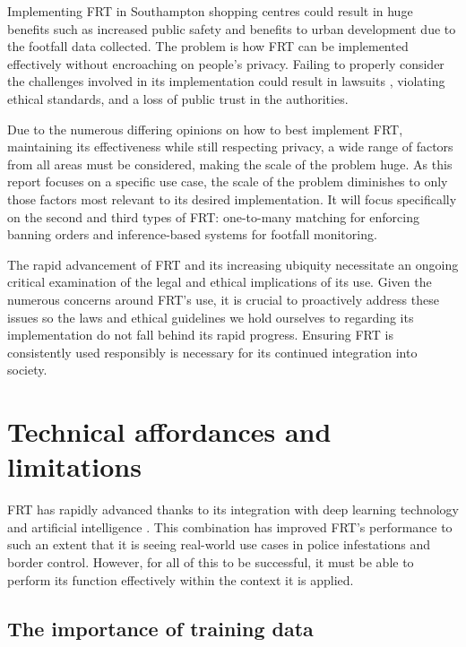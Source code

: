 \documentclass{article}
\begin{document}
Implementing FRT in Southampton shopping centres could result in huge benefits such as increased public safety and benefits to urban development due to the footfall data collected. The problem is how FRT can be implemented effectively without encroaching on people's privacy. Failing to properly consider the challenges involved in its implementation could result in lawsuits \cite{Loideain_2024}, violating ethical standards, and a loss of public trust in the authorities.

Due to the numerous differing opinions on how to best implement FRT, maintaining its effectiveness while still respecting privacy, a wide range of factors from all areas must be considered, making the scale of the problem huge. As this report focuses on a specific use case, the scale of the problem diminishes to only those factors most relevant to its desired implementation. It will focus specifically on the second and third types of FRT: one-to-many matching for enforcing banning orders and inference-based systems for footfall monitoring.
 
The rapid advancement of FRT and its increasing ubiquity necessitate an ongoing critical examination of the legal and ethical implications of its use. Given the numerous concerns around FRT's use, it is crucial to proactively address these issues so the laws and ethical guidelines we hold ourselves to regarding its implementation do not fall behind its rapid progress. Ensuring FRT is consistently used responsibly is necessary for its continued integration into society.




\section{Technical affordances and limitations}
FRT has rapidly advanced thanks to its integration with deep learning technology and artificial intelligence \cite{PPFOfFRT}. This combination has improved FRT's performance to such an extent that it is seeing real-world use cases in police infestations and border control. However, for all of this to be successful, it must be able to perform its function effectively within the context it is applied.


\subsection{The importance of training data}
\end{document}
